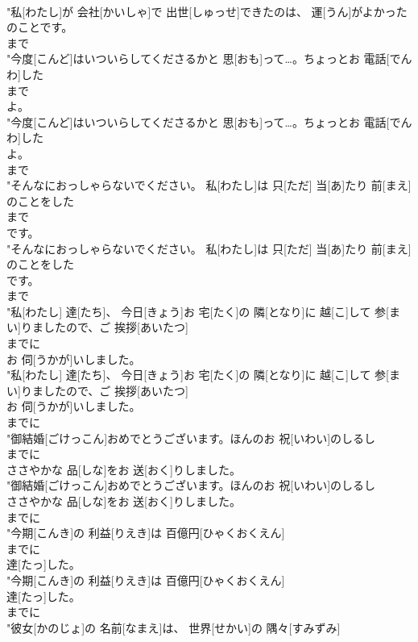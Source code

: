 \documentclass[8pt]{extreport}
\begin{document}
\begin{CJK}{UTF8}{min}
\\	"私[わたし]が 会社[かいしゃ]で 出世[しゅっせ]できたのは、 運[うん]がよかった
\\	のことです。
\\	まで
\\	"今度[こんど]はいついらしてくださるかと 思[おも]って…。ちょっとお 電話[でんわ]した
\\	まで
\\	よ。
\\	"今度[こんど]はいついらしてくださるかと 思[おも]って…。ちょっとお 電話[でんわ]した
\\	よ。
\\	まで
\\	"そんなにおっしゃらないでください。 私[わたし]は 只[ただ] 当[あ]たり 前[まえ]のことをした
\\	まで
\\	です。
\\	"そんなにおっしゃらないでください。 私[わたし]は 只[ただ] 当[あ]たり 前[まえ]のことをした
\\	です。
\\	まで
\\	"私[わたし] 達[たち]、 今日[きょう]お 宅[たく]の 隣[となり]に 越[こ]して 参[まい]りましたので、ご 挨拶[あいたつ]
\\	までに
\\	お 伺[うかが]いしました。
\\	"私[わたし] 達[たち]、 今日[きょう]お 宅[たく]の 隣[となり]に 越[こ]して 参[まい]りましたので、ご 挨拶[あいたつ]
\\	お 伺[うかが]いしました。
\\	までに
\\	"御結婚[ごけっこん]おめでとうございます。ほんのお 祝[いわい]のしるし
\\	までに
\\	ささやかな 品[しな]をお 送[おく]りしました。
\\	"御結婚[ごけっこん]おめでとうございます。ほんのお 祝[いわい]のしるし
\\	ささやかな 品[しな]をお 送[おく]りしました。
\\	までに
\\	"今期[こんき]の 利益[りえき]は 百億円[ひゃくおくえん]
\\	までに
\\	達[たっ]した。
\\	"今期[こんき]の 利益[りえき]は 百億円[ひゃくおくえん]
\\	達[たっ]した。
\\	までに
\\	"彼女[かのじょ]の 名前[なまえ]は、 世界[せかい]の 隅々[すみずみ]

\end{CJK}
\end{document}

